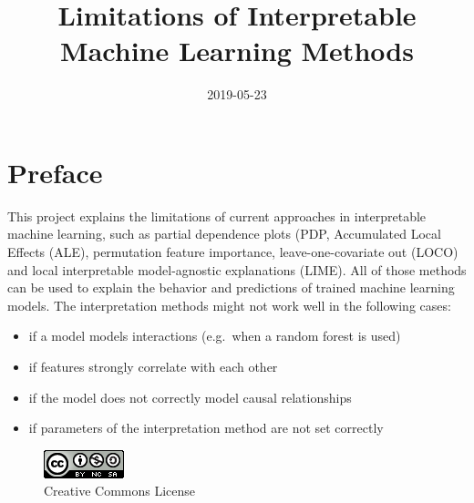 \documentclass[
]{krantz}
\title{Limitations of Interpretable Machine Learning Methods}
\date{2019-05-23}
\providecommand{\tightlist}{%
  \setlength{\itemsep}{0pt}\setlength{\parskip}{0pt}}
\begin{document}
\maketitle


\thispagestyle{empty}

\begin{center}
\end{center}

\setlength{\abovedisplayskip}{-5pt}
\setlength{\abovedisplayshortskip}{-5pt}

{
\hypersetup{linkcolor=}
\setcounter{tocdepth}{0}
\tableofcontents
}
\listoftables
\listoffigures
\hypertarget{preface}{%
\chapter*{Preface}\label{preface}}


This project explains the limitations of current approaches in interpretable machine learning, such as partial dependence plots (PDP, Accumulated Local Effects (ALE), permutation feature importance, leave-one-covariate out (LOCO) and local interpretable model-agnostic explanations (LIME).
All of those methods can be used to explain the behavior and predictions of trained machine learning models.
The interpretation methods might not work well in the following cases:

\begin{itemize}
\tightlist
\item
  if a model models interactions (e.g.~when a random forest is used)
\item
  if features strongly correlate with each other
\item
  if the model does not correctly model causal relationships
\item
  if parameters of the interpretation method are not set correctly
\end{itemize}

\begin{figure}
\centering
\includegraphics{images/by-nc-sa.png}
\caption{Creative Commons License}
\end{figure}
\end{document}
